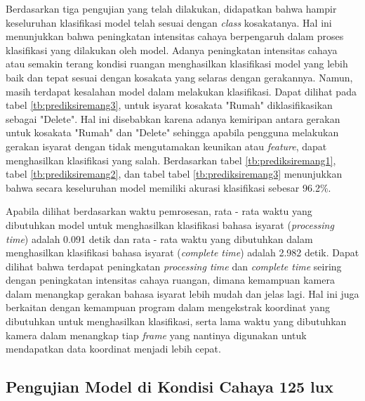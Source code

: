 Berdasarkan tiga pengujian yang telah dilakukan, didapatkan bahwa hampir keseluruhan klasifikasi model telah sesuai dengan \emph{class} kosakatanya. Hal ini menunjukkan bahwa peningkatan intensitas cahaya berpengaruh dalam proses klasifikasi yang dilakukan oleh model. Adanya peningkatan intensitas cahaya atau semakin terang kondisi ruangan menghasilkan klasifikasi model yang lebih baik dan tepat sesuai dengan kosakata yang selaras dengan gerakannya. Namun, masih terdapat kesalahan model dalam melakukan klasifikasi. Dapat dilihat pada tabel \ref{tb:prediksiremang3}, untuk isyarat kosakata "Rumah" diklasifikasikan sebagai "Delete". Hal ini disebabkan karena adanya kemiripan antara gerakan untuk kosakata "Rumah" dan "Delete" sehingga apabila pengguna melakukan gerakan isyarat dengan tidak mengutamakan keunikan atau \emph{feature}, dapat menghasilkan klasifikasi yang salah. Berdasarkan tabel \ref{tb:prediksiremang1}, tabel \ref{tb:prediksiremang2}, dan tabel tabel \ref{tb:prediksiremang3} menunjukkan bahwa secara keseluruhan model memiliki akurasi klasifikasi sebesar 96.2\%.

Apabila dilihat berdasarkan waktu pemrosesan, rata - rata waktu yang dibutuhkan model untuk menghasilkan klasifikasi bahasa isyarat (\emph{processing time}) adalah 0.091 detik dan rata - rata waktu yang dibutuhkan dalam menghasilkan klasifikasi bahasa isyarat (\emph{complete time}) adalah 2.982  detik. Dapat dilihat bahwa terdapat peningkatan \emph{processing time} dan \emph{complete time} seiring dengan peningkatan intensitas cahaya ruangan, dimana kemampuan kamera dalam menangkap gerakan bahasa isyarat lebih mudah dan jelas lagi. Hal ini juga berkaitan dengan kemampuan program dalam mengekstrak koordinat yang dibutuhkan untuk menghasilkan klasifikasi, serta lama waktu yang dibutuhkan kamera dalam menangkap tiap \emph{frame} yang nantinya digunakan untuk mendapatkan data koordinat menjadi lebih cepat.

\newpage
\subsection{Pengujian Model di Kondisi Cahaya 125 lux}
\label{sec:analisiscahaya3}

